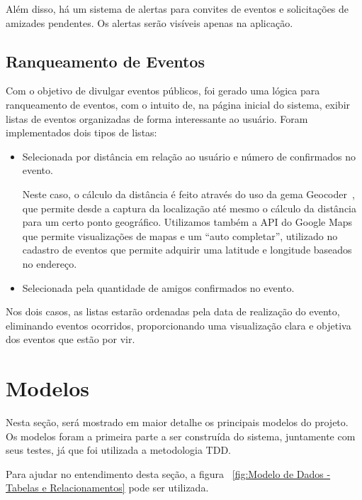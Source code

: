Além disso, há um sistema de alertas para convites de eventos e solicitações de amizades pendentes. Os alertas serão visíveis apenas na aplicação.

\subsection{Ranqueamento de Eventos}

Com o objetivo de divulgar eventos públicos, foi gerado uma lógica para ranqueamento de eventos, com o intuito de, na página inicial do sistema, exibir listas de eventos organizadas de forma interessante ao usuário. Foram implementados dois tipos de listas:

\begin{itemize}
\item Selecionada por distância em relação ao usuário e número de confirmados no evento.

Neste caso, o cálculo da distância é feito através do uso da gema Geocoder~\cite{geocoder}, que permite desde a captura da localização até mesmo o cálculo da distância para um certo ponto geográfico. Utilizamos também a API do Google Maps~\cite{google_maps} que permite visualizações de mapas e um ``auto completar'', utilizado no cadastro de eventos que permite adquirir uma latitude e longitude baseados no endereço.

\item Selecionada pela quantidade de amigos confirmados no evento.
\end{itemize}

Nos dois casos, as listas estarão ordenadas pela data de realização do evento, eliminando eventos ocorridos, proporcionando uma visualização clara e objetiva dos eventos que estão por vir.

\section{Modelos}

Nesta seção, será mostrado em maior detalhe os principais modelos do projeto. Os modelos foram a primeira parte a ser construída do sistema, juntamente com seus testes, já que foi utilizada a metodologia TDD.

Para ajudar no entendimento desta seção, a figura ~\ref{fig:Modelo de Dados - Tabelas e Relacionamentos} pode ser utilizada.

